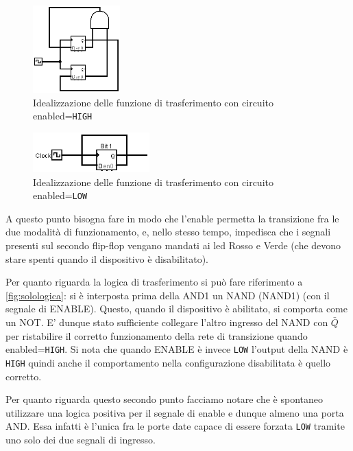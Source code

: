 \documentclass[a4paper,10pt]{article}
\def\code#1{\texttt{#1}}
\begin{document}
\begin{figure}[H]
	\centering
	\includegraphics[width=0.3\textwidth]{../grafici/enabled.png}
	\caption{Idealizzazione delle funzione di trasferimento con circuito enabled=\code{HIGH}}
	\label{fig:enabled}
\end{figure}


\begin{figure}[H]
	\centering
	\includegraphics[width=0.4\textwidth]{../grafici/disabled1.png}
	\caption{Idealizzazione delle funzione di trasferimento con circuito enabled=\code{LOW}}
	\label{fig:disabled}
\end{figure}

A questo punto bisogna fare in modo che l'enable permetta la transizione fra le due modalità di funzionamento, e, nello stesso tempo, impedisca che i segnali presenti sul secondo flip-flop vengano mandati ai led Rosso e Verde (che devono stare spenti quando il dispositivo è disabilitato).

Per quanto riguarda la logica di trasferimento si può fare riferimento a \cref{fig:solologica}: si è interposta prima della AND1 un NAND (NAND1) (con il segnale di ENABLE). Questo, quando il dispositivo è abilitato, si comporta come un NOT. E' dunque stato sufficiente collegare l'altro ingresso del NAND con $\bar{Q}$ per ristabilire il corretto funzionamento della rete di transizione quando enabled=\code{HIGH}.
Si nota che quando ENABLE è invece \code{LOW} l'output della NAND è \code{HIGH} quindi anche il comportamento nella configurazione disabilitata è quello corretto.
\newline

Per quanto riguarda questo secondo punto facciamo notare che è spontaneo utilizzare una logica positiva per il segnale di enable e dunque almeno una porta AND. Essa infatti è l'unica fra le porte date capace di essere forzata \code{LOW} tramite uno solo dei due segnali di ingresso. 
\end{document}
